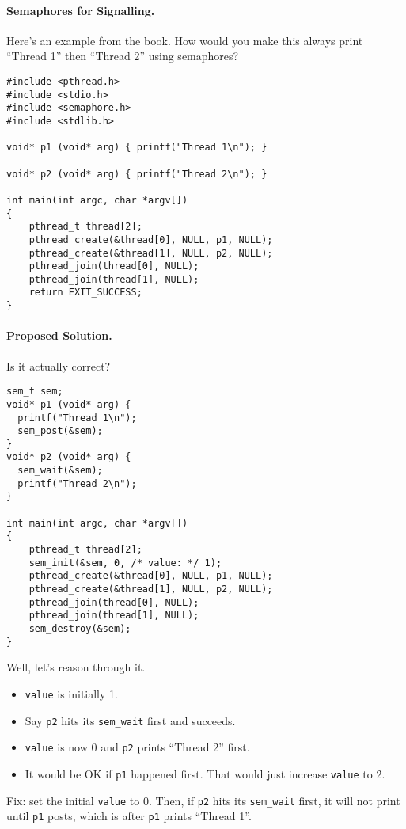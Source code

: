 \paragraph{Semaphores for Signalling.}
Here's an example from the book. How would you make this always print
``Thread 1'' then ``Thread 2'' using semaphores?

\begin{verbatim}
#include <pthread.h>
#include <stdio.h>
#include <semaphore.h>
#include <stdlib.h>

void* p1 (void* arg) { printf("Thread 1\n"); }

void* p2 (void* arg) { printf("Thread 2\n"); }

int main(int argc, char *argv[])
{
    pthread_t thread[2];
    pthread_create(&thread[0], NULL, p1, NULL);
    pthread_create(&thread[1], NULL, p2, NULL);
    pthread_join(thread[0], NULL);
    pthread_join(thread[1], NULL);
    return EXIT_SUCCESS;
}
\end{verbatim}

\paragraph{Proposed Solution.} Is it actually correct?

\begin{verbatim}
sem_t sem;
void* p1 (void* arg) {
  printf("Thread 1\n");
  sem_post(&sem);
}
void* p2 (void* arg) {
  sem_wait(&sem);
  printf("Thread 2\n");
}

int main(int argc, char *argv[])
{
    pthread_t thread[2];
    sem_init(&sem, 0, /* value: */ 1);
    pthread_create(&thread[0], NULL, p1, NULL);
    pthread_create(&thread[1], NULL, p2, NULL);
    pthread_join(thread[0], NULL);
    pthread_join(thread[1], NULL);
    sem_destroy(&sem);
}
\end{verbatim}

Well, let's reason through it.  
  \begin{itemize}
    \item {\tt value} is initially 1.
    \item Say {\tt p2} hits its {\tt sem\_wait} first and succeeds.
    \item {\tt value} is now 0 and {\tt p2} prints ``Thread 2'' first.
    \item It would be OK if {\tt p1} happened first. That would just increase
      {\tt value} to 2.
    \end{itemize}

Fix: set the initial {\tt value} to 0. Then, if {\tt p2} hits
its {\tt sem\_wait} first, it will not print until {\tt p1} posts, which is after 
{\tt p1} prints ``Thread 1''.


